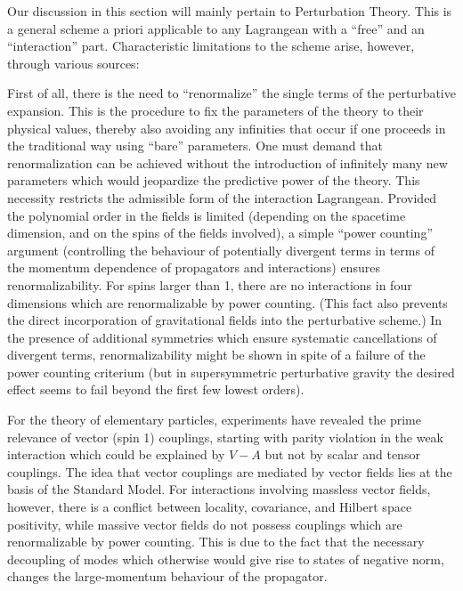 \documentclass[multphys,vecphys]{svmult}
\begin{document}
Our discussion in this section will mainly pertain to Perturbation Theory. 
This is a general scheme a priori applicable to any Lagrangean with a 
``free'' and an ``interaction'' part. Characteristic limitations to the
scheme arise, however, through various sources: 

First of all, there is the need to
``renormalize'' the single terms of the
perturbative expansion. This is the
procedure to fix the parameters of the theory to their physical
values, thereby also avoiding any infinities that occur if one
proceeds in the traditional way using ``bare'' parameters. One must
demand that renormalization can be achieved without the introduction
of infinitely many new parameters which would jeopardize the
predictive power of the theory. This necessity restricts the
admissible form of the interaction Lagrangean. Provided the polynomial 
order in the fields is limited (depending on the spacetime dimension,
and on the spins of the fields involved), a simple ``power counting'' argument (controlling the behaviour of
potentially divergent terms in terms of the momentum dependence of
propagators and interactions) ensures
renormalizability. For spins larger than 1,
there are no interactions in four dimensions which are renormalizable
by power counting. (This fact also prevents the direct incorporation
of gravitational fields into the  
perturbative scheme.) In the presence of
additional symmetries which ensure systematic cancellations of
divergent terms, renormalizability might be
shown in spite of a failure of the power
counting criterium (but in supersymmetric
perturbative gravity the desired effect seems to fail beyond the first
few lowest orders).   

For the theory of elementary particles, experiments have revealed the 
prime relevance of vector (spin 1) couplings, starting with parity
violation in the weak interaction which could be explained by $V-A$
but not by scalar and tensor couplings. The idea that vector couplings
are mediated by vector fields lies at the basis of the Standard
Model. For interactions involving massless vector fields, however,
there is a conflict between locality,
covariance, and Hilbert space
positivity, while massive vector fields do not possess couplings which
are renormalizable by power
counting. This is due to the fact that the necessary decoupling of 
modes which otherwise would give rise to states of negative norm,
changes the large-momentum behaviour of the propagator. 
\end{document}
